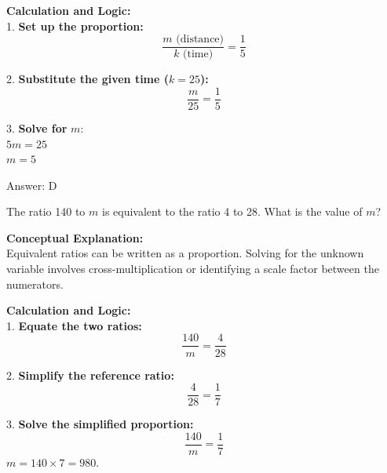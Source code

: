 \documentclass[11pt,paper=a4,answers]{exam}
\begin{document}
\begin{questions}
\begin{solution}
\vspace{30pt}

\textbf{Calculation and Logic:} \\
1. \textbf{Set up the proportion:} \\
\[ \frac{m \text{ (distance)}}{k \text{ (time)}} = \frac{1}{5} \]

\vspace{15pt}

2. \textbf{Substitute the given time ($k = 25$):} \\
\[ \frac{m}{25} = \frac{1}{5} \]

\vspace{15pt}

3. \textbf{Solve for } $m$: \\
$5m = 25$ \\
$m = 5$

\vspace{30pt}

Answer: \colorbox{yellow!100}{D}
\end{solution}

\vspace{60pt}

\question
The ratio 140 to $m$ is equivalent to the ratio 4 to 28. What is the value of $m$?

\begin{solution}
\textbf{Conceptual Explanation:} \\
Equivalent ratios can be written as a proportion. Solving for the unknown variable involves cross-multiplication or identifying a scale factor between the numerators.

\vspace{30pt}

\textbf{Calculation and Logic:} \\
1. \textbf{Equate the two ratios:} \\
\[ \frac{140}{m} = \frac{4}{28} \]

\vspace{15pt}

2. \textbf{Simplify the reference ratio:} \\
\[ \frac{4}{28} = \frac{1}{7} \]

\vspace{15pt}

3. \textbf{Solve the simplified proportion:} \\
\[ \frac{140}{m} = \frac{1}{7} \]
$m = 140 \times 7 = 980$.


\end{solution}
\end{questions}
\end{document}
